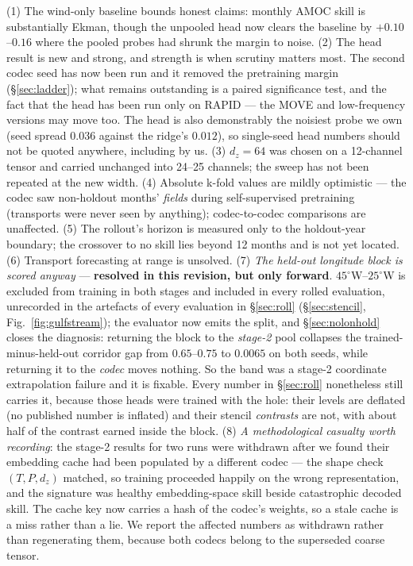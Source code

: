 \documentclass[10pt]{article}
\begin{document}
(1) The wind-only baseline bounds honest claims: monthly AMOC skill is
substantially Ekman, though the unpooled head now clears the baseline by
$+0.10$--$0.16$ where the pooled probes had shrunk the margin to noise.
(2) The head result is new and strong, and strength is when scrutiny
matters most. The second codec seed has now been run and it removed the
pretraining margin (\S\ref{sec:ladder}); what remains outstanding is a
paired significance test, and the fact that the head has been run only on
RAPID --- the MOVE and low-frequency versions may move too. The head is
also demonstrably the noisiest probe we own (seed spread $0.036$ against
the ridge's $0.012$), so single-seed head numbers should not be quoted
anywhere, including by us. (3) $d_z{=}64$ was chosen on a 12-channel tensor
and carried unchanged into 24--25 channels; the sweep has not been
repeated at the new width. (4) Absolute k-fold values
are mildly optimistic --- the codec saw non-holdout months' \emph{fields}
during self-supervised pretraining (transports were never seen by
anything); codec-to-codec comparisons are unaffected. (5) The rollout's
horizon is measured only to the holdout-year boundary; the crossover to
no skill lies beyond 12 months and is not yet located. (6) Transport
forecasting at range is unsolved. (7) \emph{The held-out longitude block is scored
anyway} --- \textbf{resolved in this revision, but only forward}.
$45^\circ$W--$25^\circ$W is excluded from training in both
stages and included in every rolled evaluation, unrecorded in the
artefacts of every evaluation in \S\ref{sec:roll} (\S\ref{sec:stencil},
Fig.~\ref{fig:gulfstream}); the evaluator now emits the split, and
\S\ref{sec:nolonhold} closes the diagnosis: returning the block to the
\emph{stage-2} pool collapses the trained-minus-held-out corridor gap from
$0.65$--$0.75$ to $0.0065$ on both seeds, while returning it to the
\emph{codec} moves nothing. So the band was a stage-2 coordinate
extrapolation failure and it is fixable. Every number in \S\ref{sec:roll}
nonetheless still carries it, because those heads were trained with the
hole: their levels are deflated (no published number is inflated) and
their stencil \emph{contrasts} are not, with about half of the contrast
earned inside the block. (8) \emph{A
methodological casualty worth recording}: the stage-2 results for two runs were
withdrawn after we found their embedding cache had been populated by a
different codec --- the shape check $(T, P, d_z)$ matched, so training
proceeded happily on the wrong representation, and the signature was
healthy embedding-space skill beside catastrophic decoded skill. The
cache key now carries a hash of the codec's weights, so a stale cache is
a miss rather than a lie. We report the affected numbers as withdrawn
rather than regenerating them, because both codecs belong to the
superseded coarse tensor.
\end{document}
